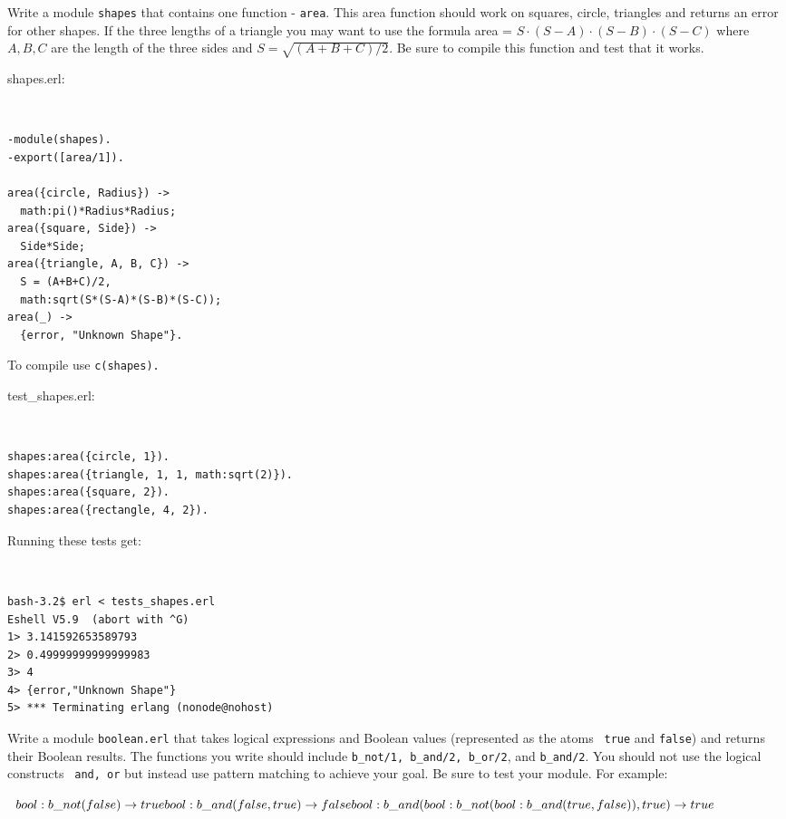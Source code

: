\begin{questions}
    \question[10] Write a module {\tt shapes} that
    contains one function - {\tt area}. This area function should work
    on squares, circle, triangles and returns an error for other
    shapes. If the three lengths of a triangle you may want to use the
    formula area = $S \cdot (S-A) \cdot (S-B) \cdot (S-C)$ where $A,
    B, C$ are the length of the three sides and $S = \sqrt{ (A+B+C)/2
    }$. Be sure to compile this function and test that it works.
    \begin{solution}
    shapes.erl:
{\tt
\begin{verbatim}
-module(shapes).
-export([area/1]).

area({circle, Radius}) ->
  math:pi()*Radius*Radius;
area({square, Side}) ->
  Side*Side;
area({triangle, A, B, C}) ->
  S = (A+B+C)/2,
  math:sqrt(S*(S-A)*(S-B)*(S-C));
area(_) ->
  {error, "Unknown Shape"}.
\end{verbatim}
}

    To compile use {\tt c(shapes).}

    test\_shapes.erl:
{\tt
\begin{verbatim}
shapes:area({circle, 1}).
shapes:area({triangle, 1, 1, math:sqrt(2)}).
shapes:area({square, 2}).
shapes:area({rectangle, 4, 2}).
\end{verbatim}
}

    Running these tests get:
{\tt
\begin{verbatim}
bash-3.2$ erl < tests_shapes.erl 
Eshell V5.9  (abort with ^G)
1> 3.141592653589793
2> 0.49999999999999983
3> 4
4> {error,"Unknown Shape"}
5> *** Terminating erlang (nonode@nohost)
\end{verbatim}
}
    \end{solution}
 
    \question[15] Write a module {\tt boolean.erl} that takes logical
    expressions and Boolean values (represented as the atoms {\tt
    true} and {\tt false}) and returns their Boolean results. The
    functions you write should include {\tt b\_not/1, b\_and/2, b\_or/2},
    and {\tt b\_and/2}. You should not use the logical constructs {\tt
    and, or} but instead use pattern matching to achieve your goal. Be
    sure to test your module. For example:

    {\tt
    $bool:b\_not(false) \to true \\
    bool:b\_and(false, true) \to false \\
    bool:b\_and(bool:b\_not(bool:b\_and(true, false)), true) \to true \\
    $}


\end{questions}
